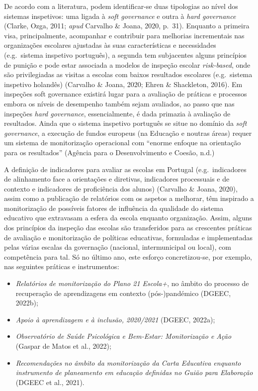 \documentclass[
]{book}
\providecommand{\tightlist}{%
  \setlength{\itemsep}{0pt}\setlength{\parskip}{0pt}}
\begin{document}
De acordo com a literatura, podem identificar-se duas tipologias ao nível dos sistemas inspetivos: uma ligada à \emph{soft governance} e outra à \emph{hard governance} (Clarke, Ozga, 2011; \emph{apud} Carvalho \& Joana, 2020, p.~31). Enquanto a primeira visa, principalmente, acompanhar e contribuir para melhorias incrementais nas organizações escolares ajustadas às suas características e necessidades (e.g.~sistema inspetivo português), a segunda tem subjacentes alguns princípios de punição e pode estar associada a modelos de inspeção escolar \emph{risk-based}, onde são privilegiadas as visitas a escolas com baixos resultados escolares (e.g.~sistema inspetivo holandês) (Carvalho \& Joana, 2020; Ehren \& Shackleton, 2016). Em inspeções soft governance existirá lugar para a avaliação de práticas e processos embora os níveis de desempenho também sejam avaliados, ao passo que nas inspeções \emph{hard governance}, essencialmente, é dada primazia à avaliação de resultados. Ainda que o sistema inspetivo português se situe no domínio da \emph{soft governance}, a execução de fundos europeus (na Educação e noutras áreas) requer um sistema de monitorização operacional com ``enorme enfoque na orientação para os resultados'' (Agência para o Desenvolvimento e Coesão, n.d.)

A definição de indicadores para avaliar as escolas em Portugal (e.g.~indicadores de alinhamento face a orientações e diretivas, indicadores processuais e de contexto e indicadores de proficiência dos alunos) (Carvalho \& Joana, 2020), assim como a publicação de relatórios com os aspetos a melhorar, têm inspirado a monitorização de possíveis fatores de influência da qualidade do sistema educativo que extravasam a esfera da escola enquanto organização. Assim, alguns dos princípios da inspeção das escolas são transferidos para as crescentes práticas de avaliação e monitorização de políticas educativas, formuladas e implementadas pelas várias escalas da governação (nacional, intermunicipal ou local), com competência para tal. Só no último ano, este esforço concretizou-se, por exemplo, nas seguintes práticas e instrumentos:

\begin{itemize}
\tightlist
\item
  \emph{Relatórios de monitorização do Plano 21 Escola+}, no âmbito do processo de recuperação de aprendizagens em contexto (pós-)pandémico (DGEEC, 2022b);
\item
  \emph{Apoio à aprendizagem e à inclusão, 2020/2021} (DGEEC, 2022a);
\item
  \emph{Observatório de Saúde Psicológica e Bem-Estar: Monitorização e Ação} (Gaspar de Matos et al., 2022);
\item
  \emph{Recomendações no âmbito da monitorização da Carta Educativa enquanto instrumento de planeamento em educação definidas no Guião para Elaboração} (DGEEC et al., 2021).
\end{itemize}
\end{document}
